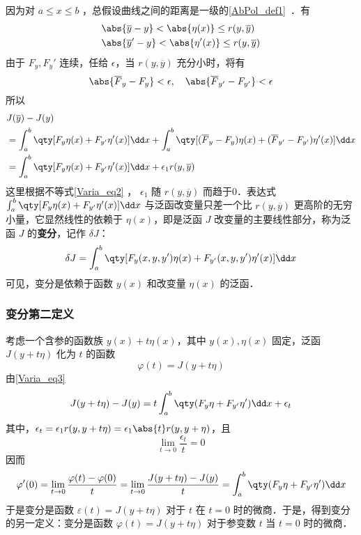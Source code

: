 因为对 $a\leq x\leq b$ ，总假设曲线之间的距离是一级的\autoref{AbPol_def1}~．有
\begin{equation}
\begin{aligned}
&\abs{\overline{y}-y}<\abs{\eta(x)}\leq r(y,\overline{y})\\
&\abs{\overline{y}'-y}<\abs{\eta'(x)}\leq r(y,\overline{y})
\end{aligned}
\end{equation}
由于 $F_y,F_y'$ 连续，任给 $\epsilon$，当 $r(y,\overline{y})$ 充分小时，将有
\begin{equation}\label{Varia_eq2}
\abs{\overline{F}_y-F_y}<\epsilon,\quad\abs{\overline{F}_{y'}-F_{y'}}<\epsilon
\end{equation}
所以
\begin{equation}\label{Varia_eq3}
\begin{aligned}
&J(\overline{y})-J(y)\\
&=\int_a^b\qty[F_y\eta(x)+F_{y'}\eta'(x)]\dd x+\int_a^b\qty[(\overline{F}_y-F_y)\eta(x)+(\overline{F}_{y'}-F_{y'})\eta'(x)]\dd x\\
&=\int_a^b\qty[F_y\eta(x)+F_{y'}\eta'(x)]\dd x+\epsilon_1r(y,\overline{y})
\end{aligned}
\end{equation}
这里根据不等式\autoref{Varia_eq2} ， $\epsilon_1$ 随 $r(y,\overline{y})$ 而趋于0．表达式 $\int_a^b\qty[F_y\eta(x)+F_{y'}\eta'(x)]\dd x$ 与泛函改变量只差一个比 $r(y,\overline{y})$ 更高阶的无穷小量，它显然线性的依赖于 $\eta(x)$，即是泛函 $J$ 改变量的主要线性部分，称为泛函 $J$ 的\textbf{变分}，记作 $\delta{J}$：
\begin{equation}
\delta J=\int_a^b\qty[F_y(x,y,y')\eta(x)+F_{y'}(x,y,y')\eta'(x)]\dd x
\end{equation}
可见，变分是依赖于函数 $y(x)$ 和改变量 $\eta(x)$ 的泛函．
\subsubsection{变分第二定义}
考虑一个含参的函数族 $y(x)+t\eta(x)$，其中 $y(x),\eta(x)$ 固定，泛函 $J(y+t\eta)$ 化为 $t$ 的函数
\begin{equation}
\varphi(t)=J(y+t\eta)
\end{equation}
由\autoref{Varia_eq3} 
\begin{equation}
J(y+t\eta)-J(y)=t\int_a^b\qty(F_y\eta+F_{y'}\eta')\dd x+\epsilon_t
\end{equation}
其中，$\epsilon_t=\epsilon_1r(y,y+t\eta)=\epsilon_1\abs{t}r(y,y+\eta)$，且
\begin{equation}
\lim_{t\rightarrow 0}\frac{\epsilon_t}{t}=0
\end{equation}
因而
\begin{equation}
\varphi'(0)=\lim_{t\rightarrow 0}\frac{\varphi(t)-\varphi(0)}{t}=\lim_{t\rightarrow 0}\frac{J(y+t\eta)-J(y)}{t}=\int_a^b\qty(F_y\eta+F_{y'}\eta')\dd x
\end{equation}
于是变分是函数 $\varepsilon(t)=J(y+t\eta)$ 对于 $t$ 在 $t=0$ 时的微商．于是，得到变分的另一定义：变分是函数 $\varphi(t)=J(y+t\eta)$ 对于参变数 $t$ 当 $t=0$ 时的微商．